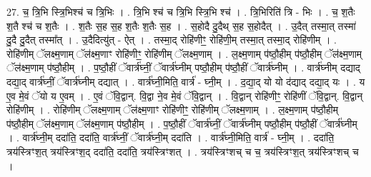 \documentclass[17pt]{extarticle}
\begin{document}
27. च॒ त्रि॒भि स्त्रि॒भिश्च॑ च त्रि॒भिः । . त्रि॒भि श्च॑ च त्रि॒भि स्त्रि॒भि श्च॑ । . त्रि॒भिरिति॑ त्रि - भिः । . च॒ श॒तैः श॒तै श्च॑ च श॒तैः । . श॒तैः स॒ह स॒ह श॒तैः श॒तैः स॒ह । . स॒होदै दु॒दैथ् स॒ह स॒होदैत् । . उ॒दैत् तस्मा॒त् तस्मा॑ दु॒दै दु॒दैत् तस्मा᳚त् । . उ॒दैदित्यु॑त् - ऐत् । . तस्मा॒द् रोहि॑णीꣳ॒॒ रोहि॑णी॒म् तस्मा॒त् तस्मा॒द् रोहि॑णीम् । . रोहि॑णीम् ॅलक्ष्म॒णाम् ॅल॑क्ष्म॒णाꣳ रोहि॑णीꣳ॒॒ रोहि॑णीम् ॅलक्ष्म॒णाम् । . ल॒क्ष्म॒णाम् प॑ष्ठौ॒हीम् प॑ष्ठौ॒हीम् ॅल॑क्ष्म॒णाम् ॅल॑क्ष्म॒णाम् प॑ष्ठौ॒हीम् । . प॒ष्ठौ॒हीं ॅवार्त्र॑घ्नीं॒ ॅवार्त्र॑घ्नीम् पष्ठौ॒हीम् प॑ष्ठौ॒हीं ॅवार्त्र॑घ्नीम् । . वार्त्र॑घ्नीम् दद्याद् दद्या॒द् वार्त्र॑घ्नीं॒ ॅवार्त्र॑घ्नीम् दद्यात् । . वार्त्र॑घ्नी॒मिति॒ वार्त्र॑ - घ्नी॒म् । . द॒द्या॒द् यो यो द॑द्याद् दद्या॒द् यः । . य ए॒व मे॒वं ॅयो य ए॒वम् । . ए॒वं ॅवि॒द्वान्. वि॒द्वा ने॒व मे॒वं ॅवि॒द्वान् । . वि॒द्वान् रोहि॑णीꣳ॒॒ रोहि॑णीं ॅवि॒द्वान्. वि॒द्वान् रोहि॑णीम् । . रोहि॑णीम् ॅलक्ष्म॒णाम् ॅल॑क्ष्म॒णाꣳ रोहि॑णीꣳ॒॒ रोहि॑णीम् ॅलक्ष्म॒णाम् । . ल॒क्ष्म॒णाम् प॑ष्ठौ॒हीम् प॑ष्ठौ॒हीम् ॅल॑क्ष्म॒णाम् ॅल॑क्ष्म॒णाम् प॑ष्ठौ॒हीम् । . प॒ष्ठौ॒हीं ॅवार्त्र॑घ्नीं॒ ॅवार्त्र॑घ्नीम् पष्ठौ॒हीम् प॑ष्ठौ॒हीं ॅवार्त्र॑घ्नीम् । . वार्त्र॑घ्नी॒म् ददा॑ति॒ ददा॑ति॒ वार्त्र॑घ्नीं॒ ॅवार्त्र॑घ्नी॒म् ददा॑ति । . वार्त्र॑घ्नी॒मिति॒ वार्त्र॑ - घ्नी॒म् । . ददा॑ति॒ त्रय॑स्त्रिꣳश॒त् त्रय॑स्त्रिꣳश॒द् ददा॑ति॒ ददा॑ति॒ त्रय॑स्त्रिꣳशत् । . त्रय॑स्त्रिꣳशच् च च॒ त्रय॑स्त्रिꣳश॒त् त्रय॑स्त्रिꣳशच् च । \newline
\end{document}
